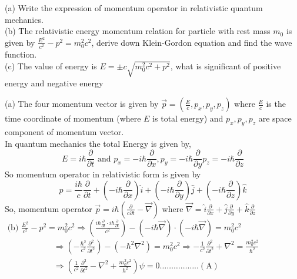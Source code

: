 \begin{enumerate}
	\begin{minipage}{\textwidth}
	\item (a) Write the expression of momentum operator in relativistic quantum mechanics.\\
	(b) The relativistic energy momentum relation for particle with rest mass $m_{0}$ is given by $\frac{E^{2}}{c^{2}}-p^{2}=m_{0}^{2} c^{2}$, derive down Klein-Gordon equation and find the wave function.\\
	(c) The value of energy is $E=\pm c \sqrt{m_{0}^{2} c^{2}+p^{2}}$, what is significant of positive energy and negative energy
\end{minipage}
\begin{answer}
(a) The four momentum vector is given by $\vec{p}=\left(\frac{E}{c}, p_{x}, p_{y}, p_{z}\right)$ where $\frac{E}{c}$ is the time coordinate of momentum (where $E$ is total energy) and $p_{x}, p_{y}, p_{z}$ are space component of momentum vector.\\
In quantum mechanics the total Energy is given by,
$$
E=i \hbar \frac{\partial}{\partial t} \text { and } p_{x}=-i \hbar \frac{\partial}{\partial x}, p_{y}=-i \hbar \frac{\partial}{\partial y} p_{z}=-i \hbar \frac{\partial}{\partial z}
$$
So momentum operator in relativistic form is given by
$$
p=\frac{i \hbar}{c} \frac{\partial}{\partial t}+\left(-i \hbar \frac{\partial}{\partial x}\right) \hat{i}+\left(-i \hbar \frac{\partial}{\partial y}\right) \hat{j}+\left(-i \hbar \frac{\partial}{\partial z}\right) \hat{k}
$$
So, momentum operator $\vec{p}=i \hbar\left(\frac{\partial}{c \partial t}-\vec{\nabla}\right)$ where $\vec{\nabla}=\hat{i} \frac{\partial}{\partial x}+\hat{j} \frac{\partial}{\partial y}+\hat{k} \frac{\partial}{\partial z}$\\
$\text { (b) } \frac{E^{2}}{c^{2}}-p^{2}=m_{0}^{2} c^{2} \Rightarrow\left(\frac{i \hbar \frac{\partial}{\partial t} \cdot i \hbar \frac{\partial}{\partial t}}{c^{2}}\right)-(-i \hbar \vec{\nabla}) \cdot(-i \hbar \vec{\nabla})=m_{0}^{2} c^{2}$\\
\begin{align*}
&\Rightarrow\left(-\frac{\hbar^{2}}{c^{2}} \frac{\partial^{2}}{\partial t^{2}}\right)-\left(-\hbar^{2} \nabla^{2}\right)=m_{0}^{2} c^{2} \Rightarrow-\frac{1}{c^{2}} \frac{\partial^{2}}{\partial t^{2}}+\nabla^{2}=\frac{m_{0}^{2} c^{2}}{\hbar^{2}} \\
&\Rightarrow\left(\frac{1}{c^{2}} \frac{\partial^{2}}{\partial t^{2}}-\nabla^{2}+\frac{m_{0}^{2} c^{2}}{\hbar^{2}}\right) \psi=0 \ldots \ldots \ldots \ldots \ldots . .(\mathrm{A})

\end{align*}
\end{answer}
\end{enumerate}
